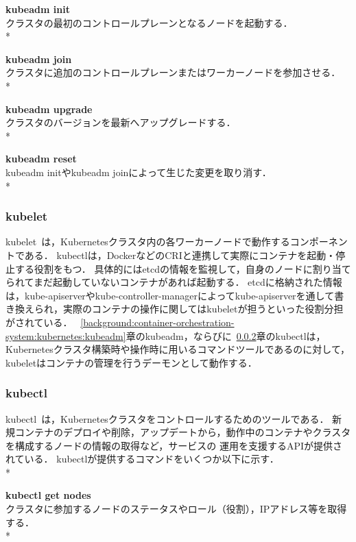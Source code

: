 {\bf kubeadm init}\\
クラスタの最初のコントロールプレーンとなるノードを起動する．\\*

{\bf kubeadm join}\\
クラスタに追加のコントロールプレーンまたはワーカーノードを参加させる．\\*

{\bf kubeadm upgrade}\\
クラスタのバージョンを最新へアップグレードする．\\*

{\bf kubeadm reset}\\
kubeadm initやkubeadm joinによって生じた変更を取り消す．\\*

\subsubsection{kubelet}
\label{background:container-orchestration-system:kubernetes:kubelet}

kubelet~\cite{kubelet}は，Kubernetesクラスタ内の各ワーカーノードで動作するコンポーネントである．
kubectlは，DockerなどのCRIと連携して実際にコンテナを起動・停止する役割をもつ．
具体的にはetcdの情報を監視して，自身のノードに割り当てられてまだ起動していないコンテナがあれば起動する．
etcdに格納された情報は，kube-apiserverやkube-controller-managerによってkube-apiserverを通して書き換えられ，実際のコンテナの操作に関してはkubeletが担うといった役割分担がされている．
~\ref{background:container-orchestration-system:kubernetes:kubeadm}章のkubeadm，ならびに~\ref{background:container-orchestration-system:kubernetes:kubectl}章のkubectlは，Kubernetesクラスタ構築時や操作時に用いるコマンドツールであるのに対して，
kubeletはコンテナの管理を行うデーモンとして動作する．

\subsubsection{kubectl}
\label{background:container-orchestration-system:kubernetes:kubectl}

kubectl~\cite{kubectl}は，Kubernetesクラスタをコントロールするためのツールである．
新規コンテナのデプロイや削除，アップデートから，動作中のコンテナやクラスタを構成するノードの情報の取得など，サービスの
運用を支援するAPIが提供されている．
kubectlが提供するコマンドをいくつか以下に示す．\\*

{\bf kubectl get nodes}\\
クラスタに参加するノードのステータスやロール（役割），IPアドレス等を取得する．\\*

